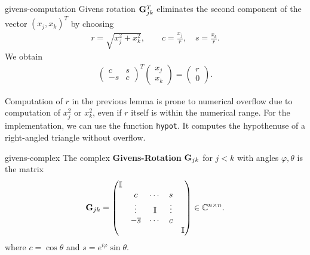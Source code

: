 \begin{Lemma}{givens-computation}
  Givens rotation $\mathbf G_{jk}^T$ eliminates the second component of the vector
  $(x_j,x_k)^T$ by choosing
  \begin{gather}
    r = \sqrt{x_j^2+x_k^2},\qquad
    c = \frac{x_j}r,\quad s = \frac{x_k}r.
  \end{gather}
  We obtain
  \begin{gather}
    \begin{pmatrix}
      c & s \\ -s & c
    \end{pmatrix}^T
    \begin{pmatrix}
      x_j\\x_k
    \end{pmatrix}
    =
    \begin{pmatrix}
      r\\0
    \end{pmatrix}
    .
  \end{gather}
\end{Lemma}


\begin{remark}
  Computation of $r$ in the previous lemma is prone to numerical
  overflow due to computation of $x_j^2$ or $x_k^2$, even if $r$
  itself is within the numerical range. For the implementation, we can
  use the function \lstinline!hypot!. It computes the hypothenuse of a
  right-angled triangle without overflow.
\end{remark}

\begin{Definition}{givens-complex}
  The complex \textbf{Givens-Rotation} $\mathbf G_{jk}$ for $j<k$ with angles $\varphi,\theta$ is the matrix
  \begin{gather}
      \mathbf G_{jk} =
    \begin{pmatrix}
      \mathbb I \\
      &c&\cdots&s\\
      &\vdots&\mathbb I &\vdots\\
      &-\overline s&\cdots&c\\
      &&&&\mathbb I
    \end{pmatrix}
    \in\mathbb C^{n\times n}.
  \end{gather}
    where $c = \cos\theta$ and $s = e^{i\varphi}\sin\theta$.
\end{Definition}

